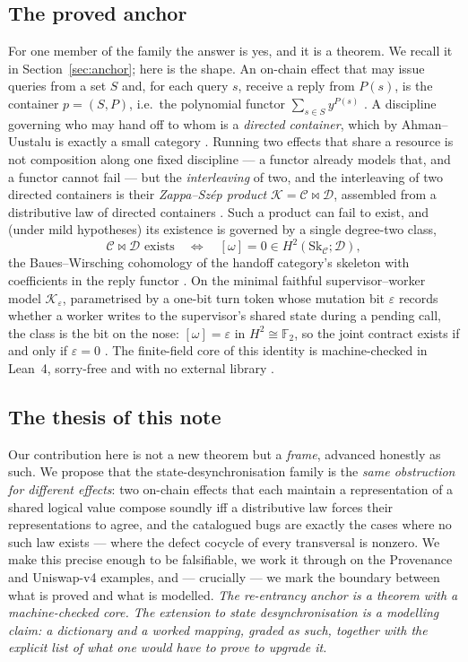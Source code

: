 \documentclass[11pt]{amsart}
\theoremstyle{definition}
\theoremstyle{remark}
\newcommand{\C}{\mathcal{C}}
\newcommand{\D}{\mathcal{D}}
\newcommand{\K}{\mathcal{K}}
\newcommand{\Sk}{\mathrm{Sk}}
\newcommand{\dir}{\mathcal{D}}
\newcommand{\FF}{\mathbb{F}_2}
\begin{document}
\subsection*{The proved anchor}
For one member of the family the answer is yes, and it is a theorem. We recall it in
Section~\ref{sec:anchor}; here is the shape. An on-chain effect that may issue queries from a set
$S$ and, for each query $s$, receive a reply from $P(s)$, is the container $p=(S,P)$, i.e.\ the
polynomial functor $\sum_{s\in S} y^{P(s)}$ \cite{NiuSpivak}. A discipline governing who may hand
off to whom is a \emph{directed container}, which by Ahman--Uustalu is exactly a small category
\cite{AhmanUustalu}. Running two effects that share a resource is not composition along one fixed
discipline --- a functor already models that, and a functor cannot fail --- but the
\emph{interleaving} of two, and the interleaving of two directed containers is their
\emph{Zappa--Sz\'ep product} $\K=\C\bowtie\D$, assembled from a distributive law of directed
containers \cite{AhmanUustaluDL}. Such a product can fail to exist, and (under mild hypotheses) its
existence is governed by a single degree-two class,
\[
  \C\bowtie\D \text{ exists}
  \quad\Longleftrightarrow\quad
  [\omega]=0 \in H^2(\Sk_\C;\dir),
\]
the Baues--Wirsching cohomology of the handoff category's skeleton with coefficients in the reply
functor \cite{gobstr,pairwise,baueswirsching}. On the minimal faithful supervisor--worker model
$\K_\varepsilon$, parametrised by a one-bit turn token whose mutation bit $\varepsilon$ records
whether a worker writes to the supervisor's shared state during a pending call, the class is the
bit on the nose: $[\omega]=\varepsilon$ in $H^2\cong\FF$, so the joint contract exists if and only
if $\varepsilon=0$ \cite{analytic}. The finite-field core of this identity is machine-checked in
Lean~4, sorry-free and with no external library \cite{leanfile}.

\subsection*{The thesis of this note}
Our contribution here is not a new theorem but a \emph{frame}, advanced honestly as such. We
propose that the state-desynchronisation family is the \emph{same obstruction for different
effects}: two on-chain effects that each maintain a representation of a shared logical value compose
soundly iff a distributive law forces their representations to agree, and the catalogued bugs are
exactly the cases where no such law exists --- where the defect cocycle of every transversal is
nonzero. We make this precise enough to be falsifiable, we work it through on the Provenance and
Uniswap-v4 examples, and --- crucially --- we mark the boundary between what is proved and what is
modelled. \emph{The re-entrancy anchor is a theorem with a machine-checked core. The extension to
state desynchronisation is a modelling claim: a dictionary and a worked mapping, graded as such,
together with the explicit list of what one would have to prove to upgrade it.}
\end{document}
